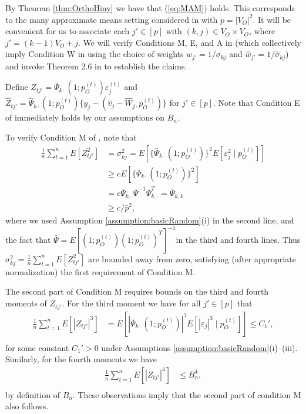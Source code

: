 \documentclass[opre,nonblindrev]{informs3} %
\begin{document}
\begin{APPENDIX}{}
	
	
	By Theorem \ref{thm:OrthoHinv} we have that (\ref{eq:MAM}) holds. This corresponds to the many approximate means setting considered in \cite{belloni2018high} with $p=|V_O|^2$. It will  be convenient for us to associate each $j'\in[p]$ with $(k,j)\in V_O\times V_O$, where $j'=(k-1)V_O+j$. We will verify Conditions M, E, and A in \cite{belloni2018high} (which collectively imply Condition W in \cite{belloni2018high} using the choice of weights $w_{j'}=1/\sigma_{kj}$ and $\hat w_{j'}=1/\hat\sigma_{kj}$) and invoke Theorem 2.6 in \cite{belloni2018high} to establish the claims.
	
	Define $Z_{tj'} = \bar\Psi_{k\cdot}(1;p_O^{(t)})\varepsilon_j^{(t)}$ and $\hat Z_{tj'} = \hat\Psi_{k\cdot}(1;p_O^{(t)})\{y_j-(\hat v_j-\hat W_{j\cdot}p_O^{(t)})\}$
	for $j'\in [p]$.
	Note that
	Condition E of \cite{belloni2018high} immediately holds by our assumptions on $B_n$.
	
	To verify Condition M of \cite{belloni2018high}, note that
	$$ \begin{array}{rl}
	\frac{1}{n}\sum_{t=1}^n E[Z_{tj'}^2] & =\sigma_{kj}^2 =  E[ \{\bar\Psi_{k\cdot}(1;p_O^{(t)})\}^2E[ \varepsilon_j^2 \mid p_O^{(t)}]] \\
		& \geq c E[ \{\bar\Psi_{k\cdot}(1;p_O^{(t)})\}^2]\\
	&=c 
	\bar\Psi_{k,\cdot} \bar{ \Psi} ^{-1} \bar\Psi_{k,\cdot}^T =
	\bar \Psi_{k,k}\\

	& \geq c/\bar p^2,
	\end{array}$$
	where we used Assumption \ref{assumption:basicRandom}(i) in the second line, and
	the fact that $\bar\Psi=E[(1;p_O^{(t)})(1;p_O^{(t)})^T]^{-1}$in the third and fourth lines.
Thus $\sigma_{kj}^2=\frac{1}{n}\sum_{t=1}^n E[Z_{tj'}^2]$ are bounded away from zero, satisfying 
(after appropriate normalization)
the first requirement of Condition M.
	
	The second part of Condition M requires bounds on the third and fourth moments of $Z_{tj'}$. For the third moment we have for all $j'\in[p]$ that $$ \begin{array}{rl}
	\frac{1}{n}\sum_{t=1}^n E[|Z_{tj'}|^3] & =  E[ |\bar\Psi_{k\cdot}(1;p_O^{(t)})|^3E[ |\varepsilon_j|^3 \mid p_O^{(t)}]] \leq C_1',\\
	\end{array}$$
	for some constant $C_1'>0$
	under Assumptions \ref{assumption:basicRandom}(i)--(iii).
	Similarly, for the fourth moments we have $$ \begin{array}{rl}
	\frac{1}{n}\sum_{t=1}^n E[|Z_{tj'}|^4] & \leq  B_n^4,\\
	\end{array}$$
by definition of $B_n$.
These observations imply that the second part of condition M also follows.
	

\end{APPENDIX}
\end{document}
